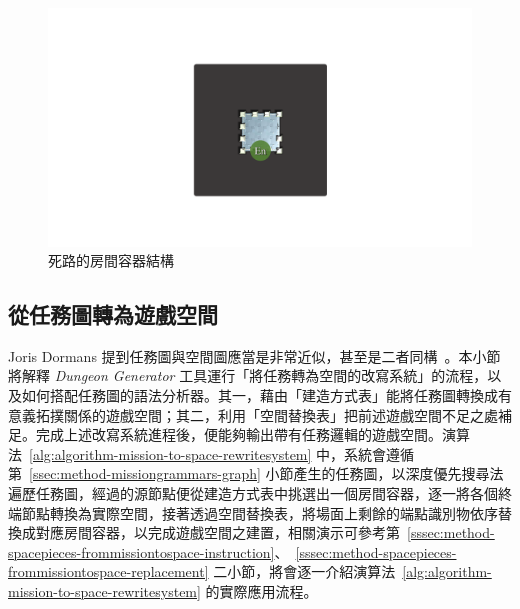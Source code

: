 \begin{figure}[!htb]
  \begin{center}
    \includegraphics[width=1.0\textwidth]{figures/roomtype-wall.pdf}
    \caption{死路的房間容器結構}
    \label{fig:roomtype-wall}
  \end{center}
\end{figure}

\subsection{從任務圖轉為遊戲空間}
\label{ssec:method-spacepieces-frommissiontospace}

Joris Dormans 提到任務圖與空間圖應當是非常近似，甚至是二者同構~\cite{dormans2010adventures}。本小節將解釋 \textit{Dungeon Generator} 工具運行「將任務轉為空間的改寫系統」的流程，以及如何搭配任務圖的語法分析器。其一，藉由「建造方式表」能將任務圖轉換成有意義拓撲關係的遊戲空間；其二，利用「空間替換表」把前述遊戲空間不足之處補足。完成上述改寫系統進程後，便能夠輸出帶有任務邏輯的遊戲空間。演算法~\ref{alg:algorithm-mission-to-space-rewritesystem} 中，系統會遵循第~\ref{ssec:method-missiongrammars-graph} 小節產生的任務圖，以深度優先搜尋法遍歷任務圖，經過的源節點便從建造方式表中挑選出一個房間容器，逐一將各個終端節點轉換為實際空間，接著透過空間替換表，將場面上剩餘的端點識別物依序替換成對應房間容器，以完成遊戲空間之建置，相關演示可參考第~\ref{sssec:method-spacepieces-frommissiontospace-instruction}、~\ref{sssec:method-spacepieces-frommissiontospace-replacement} 二小節，將會逐一介紹演算法~\ref{alg:algorithm-mission-to-space-rewritesystem} 的實際應用流程。

